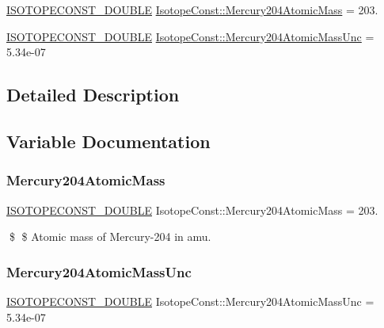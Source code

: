 \begin{DoxyCompactItemize}
\item 
\mbox{\hyperlink{group___isotope_const-_macros_ga8f45a7272ce02c0b4c65c44636ed719a}{I\+S\+O\+T\+O\+P\+E\+C\+O\+N\+S\+T\+\_\+\+D\+O\+U\+B\+LE}} \mbox{\hyperlink{group___isotope_const-_mercury-_hg204_ga562854ae92953201b3f1831fcb3a9812}{Isotope\+Const\+::\+Mercury204\+Atomic\+Mass}} = 203.
\item 
\mbox{\hyperlink{group___isotope_const-_macros_ga8f45a7272ce02c0b4c65c44636ed719a}{I\+S\+O\+T\+O\+P\+E\+C\+O\+N\+S\+T\+\_\+\+D\+O\+U\+B\+LE}} \mbox{\hyperlink{group___isotope_const-_mercury-_hg204_gab89282bb441e503d2105c0c1570c944b}{Isotope\+Const\+::\+Mercury204\+Atomic\+Mass\+Unc}} = 5.\+34e-\/07
\end{DoxyCompactItemize}


\subsection{Detailed Description}


\subsection{Variable Documentation}
\mbox{\label{group___isotope_const-_mercury-_hg204_ga562854ae92953201b3f1831fcb3a9812}} 
\subsubsection{\texorpdfstring{Mercury204\+Atomic\+Mass}{Mercury204AtomicMass}}
{\footnotesize\ttfamily \mbox{\hyperlink{group___isotope_const-_macros_ga8f45a7272ce02c0b4c65c44636ed719a}{I\+S\+O\+T\+O\+P\+E\+C\+O\+N\+S\+T\+\_\+\+D\+O\+U\+B\+LE}} Isotope\+Const\+::\+Mercury204\+Atomic\+Mass = 203.}

\$ \$ Atomic mass of Mercury-\/204 in amu. \mbox{\label{group___isotope_const-_mercury-_hg204_gab89282bb441e503d2105c0c1570c944b}} 
\subsubsection{\texorpdfstring{Mercury204\+Atomic\+Mass\+Unc}{Mercury204AtomicMassUnc}}
{\footnotesize\ttfamily \mbox{\hyperlink{group___isotope_const-_macros_ga8f45a7272ce02c0b4c65c44636ed719a}{I\+S\+O\+T\+O\+P\+E\+C\+O\+N\+S\+T\+\_\+\+D\+O\+U\+B\+LE}} Isotope\+Const\+::\+Mercury204\+Atomic\+Mass\+Unc = 5.\+34e-\/07}

